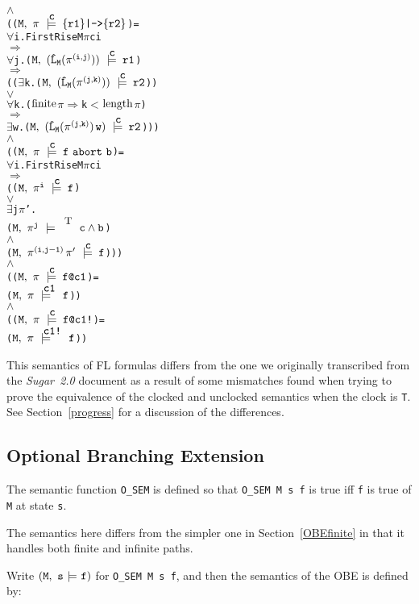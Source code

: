 \documentclass{llncs}
\makeatletter
\newcommand{\And}{\(\wedge\)}
\newcommand{\Or}{\(\vee\)}
\newcommand{\Imp}{\(\Rightarrow\)}
\newcommand{\Forall}{\(\forall\)}
\newcommand{\Exists}{\(\exists\)}
\newcommand{\IsFinitePath}{\({\rm{finite}}\)}
\newcommand{\PathLength}{\({\rm{length}}\)}
\newcommand{\cat}{\hspace*{0.5mm}}
\newcommand{\pathCat}[2]{#1\hspace*{0.5mm}#2}
\newcommand{\Le}{\(<\)}
\newcommand{\T}{\texttt{\small\rm{T}}}
\renewcommand{\Pi}{\(\pi\)}
\newcommand{\SSem}[4]{(\(\tt{#1,~#2~\models^{\hspace*{-2.3mm}\raisebox{1mm}{\tt#3}}~#4}\))}
\newcommand{\FSem}[4]{(\(\tt{#1,~#2~\models^{\hspace*{-2.3mm}\raisebox{1mm}{\tt#3}}~#4}\))}
\newcommand{\Osem}{\texttt{O\_SEM}\xspace}
\newcommand{\oSem}[3]{(\tt{#1,~#2~{\models}~#3})}
\newcommand{\FBool}[1]{#1}
\newcommand{\weakClock}[1]{#1}
\newcommand{\strongClock}[1]{#1!}
\newcommand{\restN}[2]{#1^{#2}}
\newcommand{\pathSeg}[2]{#1^{#2}}
\newcommand{\lHat}[1]{\hat{\texttt{L}}_{#1}}
\newcommand{\bAnd}[2]{#1\wedge#2}
\newcommand{\fWeakImp}[2]{\{#1\}\texttt{|->}\{#2\}}
\newcommand{\fAbort}[2]{#1~\texttt{abort}~#2}
\newcommand{\fWeakClock}[2]{#1\texttt{@}#2}
\newcommand{\fStrongClock}[2]{#1\texttt{@}#2\texttt{!}}
\newcommand\Sugar{{\it{Sugar~2.0}}\xspace}
\renewcommand{\t}[1]{\texttt{#1}}
\makeatother
\begin{document}
{\begin{alltt}
    {\And}
    ({\FSem{M}{{\pi}}{{\weakClock{c}}}{\fWeakImp{r1}{r2}}} = 
      {\Forall}i.  FirstRise M {\Pi} c i
           {\Imp}
           {\Forall}j. \SSem{M}{(\lHat{M} (\pathSeg{\pi}{(i,j)}))}{c}{r1}
               {\Imp}
               (({\Exists}k. \SSem{M}{ (\lHat{M} (\pathSeg{\pi}{(j,k)}))}{c}{r2})
                {\Or}
                {\Forall}k. ({\IsFinitePath} {\Pi} {\Imp} k {\Le} \PathLength {\Pi})
                     {\Imp}
                     {\Exists}w. \SSem{M}{(\lHat{M} (\pathSeg{\pi}{(j,k)}){\cat}w)}{c}{r2}))
    {\And}
    ({\FSem{M}{{\pi}}{{\weakClock{c}}}{\fAbort{f}{b}}} =
      {\Forall}i. FirstRise M {\Pi} c i 
          {\Imp}
          ({\FSem{M}{\restN{{\pi}}{i}}{{\weakClock{c}}}{f}} 
           {\Or}   
           {\Exists}j {\Pi}'. 
            {\FSem{M}{\restN{{\pi}}{j}}{\weakClock{\T}}{{\FBool{\bAnd{c}{b}}}}}
            {\And}
            {\FSem{M}{\pathCat{\pathSeg{\pi}{(i,j-1)}}{{\pi}'}}{{\weakClock{c}}}{f}}))
    {\And}
    ({\FSem{M}{{\pi}}{{\weakClock{c}}}{\fWeakClock{f}{c1}}} =   
      {\FSem{M}{{\pi}}{{\weakClock{c1}}}{f}})
    {\And}
    ({\FSem{M}{{\pi}}{{\weakClock{c}}}{\fStrongClock{f}{c1}}} =   
      {\FSem{M}{{\pi}}{{\strongClock{c1}}}{f}})
\end{alltt}}


This semantics of FL formulas differs from the one we originally transcribed from the \Sugar document
as a result of some mismatches found when trying to prove the equivalence of
the clocked and unclocked semantics when the clock is \t{T}. See Section~\ref{progress}
for a discussion of the differences.



\subsection{Optional Branching Extension}\label{OBE}


The semantic function \Osem is defined so that
\texttt{\Osem~M~s~f} is true iff \texttt{f} is true of \texttt{M} at
state \texttt{s}.

The semantics here differs from the simpler one in Section~\ref{OBEfinite}
in that it handles both finite and infinite paths.

Write $\oSem{M}{s}{f}$ for \texttt{\Osem~M~s~f}, and then the semantics of the OBE is defined by:
\end{document}
